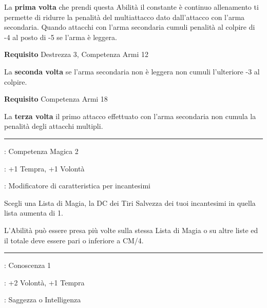 \begin{multicols}{2}
La \textbf{prima volta} che prendi questa Abilità il constante è continuo allenamento ti permette di ridurre la penalità del multiattacco dato dall'attacco con l'arma secondaria. Quando attacchi con l'arma secondaria cumuli penalità al colpire di -4 al posto di -5 se l'arma è leggera.

\textbf{Requisito} Destrezza 3, Competenza Armi 12

La \textbf{seconda volta} se l'arma secondaria non è leggera non cumuli l'ulteriore -3 al colpire.

\textbf{Requisito} Competenza Armi 18

La \textbf{terza volta} il primo attacco effettuato con l'arma secondaria non cumula la penalità degli attacchi multipli.

\smallskip\noindent\rule{\linewidth}{2pt} \hypertarget{Concentrato}{}\medskip{}
\noindent
\begin{description}[noitemsep, topsep=0pt, parsep=0pt, partopsep=0pt, leftmargin=0cm, labelwidth=2.5cm]
    \item[\textbf{Requisito}]: Competenza Magica 2
    \item[\textbf{Tiri Salvezza}]: +1 Tempra, +1 Volontà
    \item[\textbf{Caratteristica}]: Modificatore di caratteristica per incantesimi
\end{description}

Scegli una Lista di Magia, la DC dei Tiri Salvezza dei tuoi incantesimi in quella lista aumenta di 1.

L'Abilità può essere presa più volte sulla stessa Lista di Magia o su altre liste ed il totale deve essere pari o inferiore a CM/4.

\smallskip\noindent\rule{\linewidth}{2pt} \hypertarget{Conoscenza istintiva}{}\medskip{}
\noindent
\begin{description}[noitemsep, topsep=0pt, parsep=0pt, partopsep=0pt, leftmargin=0cm, labelwidth=2.5cm]
    \item[\textbf{Requisito}]: Conoscenza 1
    \item[\textbf{Tiri Salvezza}]: +2 Volontà, +1 Tempra
    \item[\textbf{Caratteristica}]: Saggezza o Intelligenza
\end{description}


\end{multicols}
